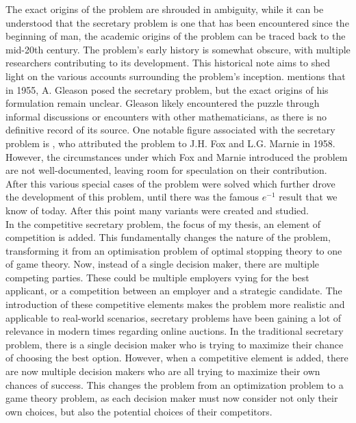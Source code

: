 \documentclass{article}
\begin{document}
The exact origins of the problem are shrouded in ambiguity, while it can be understood that the secretary problem is one that has been encountered since the beginning of man, the academic origins of the problem can be traced back to the mid-20th century. The problem's early history is somewhat obscure, with multiple researchers contributing to its development. This historical note aims to shed light on the various accounts surrounding the problem's inception. \cite{gilbert196620} mentions that in 1955, A. Gleason posed the secretary problem, but the exact origins of his formulation remain unclear. Gleason likely encountered the puzzle through informal discussions or encounters with other mathematicians, as there is no definitive record of its source. One notable figure associated with the secretary problem is \cite{gardner1960mathematical}, who attributed the problem to J.H. Fox and L.G. Marnie in 1958. However, the circumstances under which Fox and Marnie introduced the problem are not well-documented, leaving room for speculation on their contribution. After this various special cases of the problem were solved which further drove the development of this problem, until there was the famous $e^{-1}$ result that we know of today. After this point many variants were created and studied.
\\[2ex]
In the competitive secretary problem, the focus of my thesis, an element of competition is added. This fundamentally changes the nature of the problem, transforming it from an optimisation problem of optimal stopping theory to one of game theory. Now, instead of a single decision maker, there are multiple competing parties. These could be multiple employers vying for the best applicant, or a competition between an employer and a strategic candidate. The introduction of these competitive elements makes the problem more realistic and applicable to real-world scenarios, secretary problems have been gaining a lot of relevance in modern times regarding online auctions. In the traditional secretary problem, there is a single decision maker who is trying to maximize their chance of choosing the best option. However, when a competitive element is added, there are now multiple decision makers who are all trying to maximize their own chances of success. This changes the problem from an optimization problem to a game theory problem, as each decision maker must now consider not only their own choices, but also the potential choices of their competitors.
\end{document}
